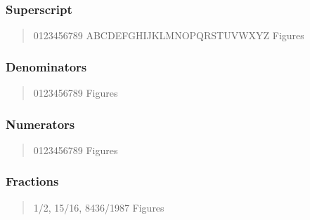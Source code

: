 \subsubsection{Superscript}
\begin{quote}
{ 0123456789 ABCDEFGHIJKLMNOPQRSTUVWXYZ} Figures
\end{quote}

\subsubsection{Denominators}
\begin{quote}
{ 0123456789 Figures}
\end{quote}

\subsubsection{Numerators}
\begin{quote}
{ 0123456789 Figures}
\end{quote}

\subsubsection{Fractions}
\begin{quote}
{ 1/2, 15/16, 8436/1987 Figures}
\end{quote}